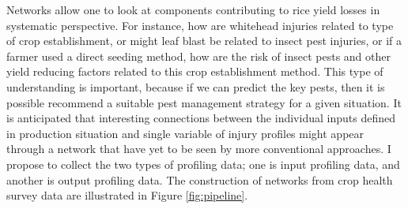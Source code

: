 


Networks allow one to look at components contributing to rice yield losses in systematic perspective. For instance, how are whitehead injuries related to type of crop establishment, or might leaf blast be related to insect pest injuries, or if a farmer used a direct seeding method, how are the risk of insect pests and other yield reducing factors related to this crop establishment method. This type of understanding is important, because if we can predict the key pests, then it is possible recommend a suitable pest management strategy for a given situation. It is anticipated that interesting connections between the individual inputs defined in production situation and single variable of injury profiles might appear through a network that have yet to be seen by more conventional approaches. I propose to collect the two types of profiling data; one is input profiling data, and another is output profiling data.  The construction of networks from crop health survey data are illustrated in Figure \ref{fig:pipeline}.

 


